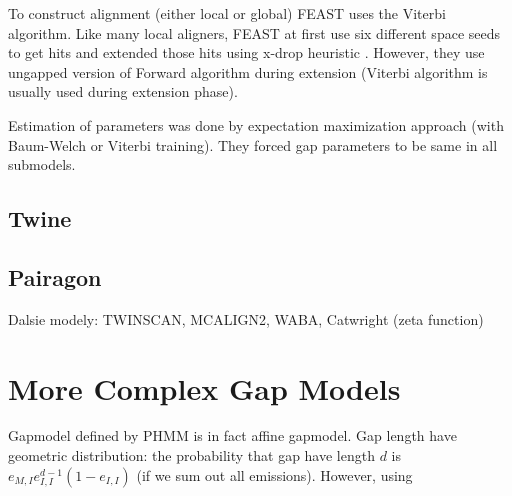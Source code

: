 To construct alignment (either local or global) FEAST uses the Viterbi
algorithm. Like many local aligners, FEAST at first use six different space
seeds to get hits and extended those hits using x-drop heuristic \cite{}.
However, they use ungapped version of Forward algorithm during extension
(Viterbi algorithm is usually used during extension phase).

Estimation of parameters was done by expectation maximization approach (with
Baum-Welch or Viterbi training). They forced gap parameters to be same in all
submodels.

\subsection{Twine}
\subsection{Pairagon}


Dalsie modely: TWINSCAN, MCALIGN2, WABA, Catwright (zeta function)

\section{More Complex Gap Models}
Gapmodel defined by PHMM is in fact affine gapmodel.
Gap length have geometric distribution: the probability that gap have length $d$
is $e_{M,I}e_{I,I}^{d-1}(1-e_{I,I})$ (if we sum out all emissions). However,
using

